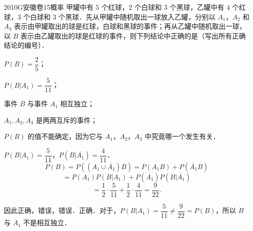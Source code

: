 
\begin{problem}{2010}{G}{安徽卷}{15}{概率}
甲罐中有 $5$ 个红球，$2$ 个白球和 $3$ 个黑球，乙罐中有 $4$ 个红球，$3$ 个白球和 $3$ 个黑球．先从甲罐中随机取出一球放入乙罐，分别以 $A_1$，$A_2$ 和 $A_3$ 表示由甲罐取出的球是红球，白球和黑球的事件；再从乙罐中随机取出一球，以 $B$ 表示由乙罐取出的球是红球的事件，则下列结论中正确的是\hspace{1cm}（写出所有正确结论的编号）．

 $P(B)=\dfrac{2}{5}$；

 $P(B|A_1)=\dfrac{5}{11}$；

 事件 $B$ 与事件 $A_1$ 相互独立；

 $A_1,A_2,A_3$ 是两两互斥的事件；

 $P(B)$ 的值不能确定，因为它与 $A_1$，$A_2$，$A_3$ 中究竟哪一个发生有关．
\end{problem}

\begin{answer}
\end{answer}

\begin{solutions}
$P(B|A_1)=\dfrac{5}{11}$，$P(B|\overline{A_1})=\dfrac{4}{11}$．
$$
P(B) = P((A_1 \cup \overline{A_1})B) = P(A_1 B) + P(\overline{A_1} B)
$$
$$
= P(A_1)P(B|A_1) + P(\overline{A_1})P(B|\overline{A_1})
$$
$$
= \dfrac{1}{2} \cdot \dfrac{5}{11} + \dfrac{1}{2} \cdot \dfrac{4}{11} = \dfrac{9}{22}.
$$

因此正确，错误，错误．正确．对于，$P(B|A_1)=\dfrac{5}{11} \neq \dfrac{9}{22}=P(B)$，所以 $B$ 与 $A_1$ 不是相互独立．
\end{solutions}